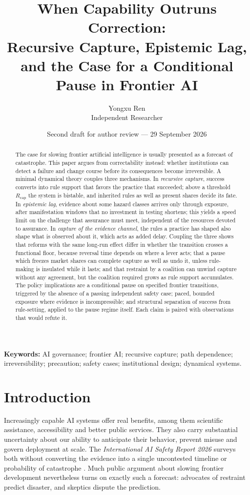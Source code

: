 \documentclass[11pt]{article}
\title{When Capability Outruns Correction:\\Recursive Capture, Epistemic Lag, and the Case for a Conditional Pause in Frontier AI}
\author{Yongxu Ren\\Independent Researcher}
\date{Second draft for author review --- 29 September 2026}
\theoremstyle{plain}
\theoremstyle{definition}
\newcommand{\Rcap}{R_{\mathrm{cap}}}
\begin{document}
\maketitle

\begin{abstract}
The case for slowing frontier artificial intelligence is usually presented as a forecast of catastrophe. This paper argues from correctability instead: whether institutions can detect a failure and change course before its consequences become irreversible. A minimal dynamical theory couples three mechanisms. In \emph{recursive capture}, success converts into rule support that favors the practice that succeeded; above a threshold $\Rcap$ the system is bistable, and inherited rules as well as present shares decide its fate. In \emph{epistemic lag}, evidence about some hazard classes arrives only through exposure, after manifestation windows that no investment in testing shortens; this yields a speed limit on the challenge that assurance must meet, independent of the resources devoted to assurance. In \emph{capture of the evidence channel}, the rules a practice has shaped also shape what is observed about it, which acts as added delay. Coupling the three shows that reforms with the same long-run effect differ in whether the transition crosses a functional floor, because reversal time depends on where a lever acts; that a pause which freezes market shares can complete capture as well as undo it, unless rule-making is insulated while it lasts; and that restraint by a coalition can unwind capture without any agreement, but the coalition required grows as rule support accumulates. The policy implications are a conditional pause on specified frontier transitions, triggered by the absence of a passing independent safety case; paced, bounded exposure where evidence is incompressible; and structural separation of success from rule-setting, applied to the pause regime itself. Each claim is paired with observations that would refute it.
\end{abstract}

\noindent\textbf{Keywords:} AI governance; frontier AI; recursive capture; path dependence; irreversibility; precaution; safety cases; institutional design; dynamical systems.

\section{Introduction}\label{sec:intro}

Increasingly capable AI systems offer real benefits, among them scientific assistance, accessibility and better public services. They also carry substantial uncertainty about our ability to anticipate their behavior, prevent misuse and govern deployment at scale. The \emph{International AI Safety Report 2026} surveys both without converting the evidence into a single uncontested timeline or probability of catastrophe \citep{iasr2026}. Much public argument about slowing frontier development nevertheless turns on exactly such a forecast: advocates of restraint predict disaster, and skeptics dispute the prediction.
\end{document}
